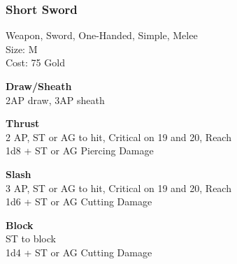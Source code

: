 \subsubsection{Short Sword}\label{weapon:shortSword}
Weapon, Sword, One-Handed, Simple, Melee\\
Size: M\\
Cost: 75 Gold

\textbf{Draw/Sheath}\\
2AP draw, 3AP sheath

\textbf{Thrust}\\
2 AP, ST or AG to hit, Critical on 19 and 20,  Reach\\
1d8 + \texttimes ST or AG Piercing Damage

\textbf{Slash}\\
3 AP, ST or AG to hit, Critical on 19 and 20,  Reach\\
1d6 + \texttimes ST or AG Cutting Damage

\textbf{Block}\\
ST to block\\
1d4 + \texttimes ST or AG Cutting Damage

